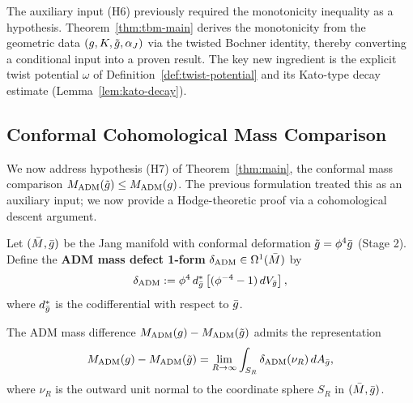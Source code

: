 \begin{remark}
The auxiliary input (H6) previously required the monotonicity inequality as a hypothesis. Theorem~\ref{thm:tbm-main} derives the monotonicity from the geometric data $(g, K, \tilde{g}, \alpha_J)$ via the twisted Bochner identity, thereby converting a conditional input into a proven result. The key new ingredient is the explicit twist potential $\omega$ of Definition~\ref{def:twist-potential} and its Kato-type decay estimate (Lemma~\ref{lem:kato-decay}).
\end{remark}

\subsection{Conformal Cohomological Mass Comparison}

We now address hypothesis (H7) of Theorem~\ref{thm:main}, the conformal mass comparison $M_{\mathrm{ADM}}(\tilde{g}) \leq M_{\mathrm{ADM}}(g)$. The previous formulation treated this as an auxiliary input; we now provide a Hodge-theoretic proof via a cohomological descent argument.

\begin{definition}\label{def:adm-defect}
Let $(\bar{M}, \bar{g})$ be the Jang manifold with conformal deformation $\tilde{g} = \phi^4 \bar{g}$ (Stage 2). Define the \textbf{ADM mass defect 1-form} $\delta_{\mathrm{ADM}} \in \Omega^1(\bar{M})$ by
\begin{equation}\label{eq:adm-defect}
\delta_{\mathrm{ADM}} := \phi^4 \, d^*_{\bar{g}} \left[ (\phi^{-4} - 1) \, dV_{\bar{g}} \right],
\end{equation}
where $d^*_{\bar{g}}$ is the codifferential with respect to $\bar{g}$.
\end{definition}

\begin{lemma}\label{lem:adm-defect-integral}
The ADM mass difference $M_{\mathrm{ADM}}(g) - M_{\mathrm{ADM}}(\tilde{g})$ admits the representation
\begin{equation}\label{eq:adm-defect-integral}
M_{\mathrm{ADM}}(g) - M_{\mathrm{ADM}}(\tilde{g}) = \lim_{R \to \infty} \int_{S_R} \delta_{\mathrm{ADM}}(\nu_R) \, dA_{\bar{g}},
\end{equation}
where $\nu_R$ is the outward unit normal to the coordinate sphere $S_R$ in $(\bar{M}, \bar{g})$.
\end{lemma}

